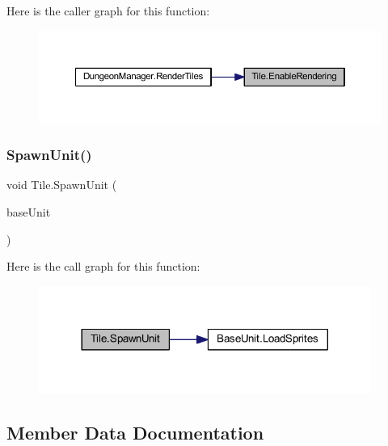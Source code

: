 Here is the caller graph for this function\+:
\nopagebreak
\begin{figure}[H]
\begin{center}
\leavevmode
\includegraphics[width=350pt]{class_tile_a1baa5fe3ab8f887e8985a85fba21210a_icgraph}
\end{center}
\end{figure}
\mbox{\label{class_tile_a183188c193a2ba5b62c8cdfc6d63471d}} 
\subsubsection{\texorpdfstring{SpawnUnit()}{SpawnUnit()}}
{\footnotesize\ttfamily void Tile.\+Spawn\+Unit (\begin{DoxyParamCaption}\item[{\mbox{\hyperlink{class_base_unit}{Base\+Unit}}}]{base\+Unit }\end{DoxyParamCaption})}

Here is the call graph for this function\+:
\nopagebreak
\begin{figure}[H]
\begin{center}
\leavevmode
\includegraphics[width=308pt]{class_tile_a183188c193a2ba5b62c8cdfc6d63471d_cgraph}
\end{center}
\end{figure}


\subsection{Member Data Documentation}
\mbox{\label{class_tile_a1a28313208606507b9c570a141461eab}} 
